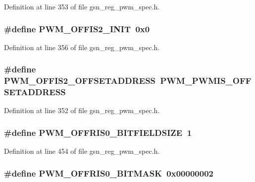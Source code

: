Definition at line 353 of file gsn\_\-reg\_\-pwm\_\-spec.h.

\hypertarget{a00565_a73ae00395d1cf4ed2ca2babab730d6ec}{
\subsubsection[{PWM\_\-OFFIS2\_\-INIT}]{\setlength{\rightskip}{0pt plus 5cm}\#define PWM\_\-OFFIS2\_\-INIT~0x0}}
\label{a00565_a73ae00395d1cf4ed2ca2babab730d6ec}


Definition at line 356 of file gsn\_\-reg\_\-pwm\_\-spec.h.

\hypertarget{a00565_a2e47de59f6ab527f42e6960c00488d3b}{
\subsubsection[{PWM\_\-OFFIS2\_\-OFFSETADDRESS}]{\setlength{\rightskip}{0pt plus 5cm}\#define PWM\_\-OFFIS2\_\-OFFSETADDRESS~PWM\_\-PWMIS\_\-OFFSETADDRESS}}
\label{a00565_a2e47de59f6ab527f42e6960c00488d3b}


Definition at line 352 of file gsn\_\-reg\_\-pwm\_\-spec.h.

\hypertarget{a00565_ae4c07c49aa63a2897740abfdb2994484}{
\subsubsection[{PWM\_\-OFFRIS0\_\-BITFIELDSIZE}]{\setlength{\rightskip}{0pt plus 5cm}\#define PWM\_\-OFFRIS0\_\-BITFIELDSIZE~1}}
\label{a00565_ae4c07c49aa63a2897740abfdb2994484}


Definition at line 454 of file gsn\_\-reg\_\-pwm\_\-spec.h.

\hypertarget{a00565_a75da53217a98c663bc356f68f588a7bf}{
\subsubsection[{PWM\_\-OFFRIS0\_\-BITMASK}]{\setlength{\rightskip}{0pt plus 5cm}\#define PWM\_\-OFFRIS0\_\-BITMASK~0x00000002}}
\label{a00565_a75da53217a98c663bc356f68f588a7bf}


